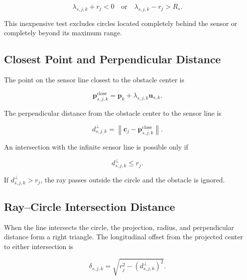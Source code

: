 \documentclass[10pt,twocolumn,a4paper]{article}
\begin{document}
\begin{equation}
    \lambda_{s,j,k}+r_j<0
    \quad\text{or}\quad
    \lambda_{s,j,k}-r_j>R_s.
    \label{eq:range_rejection}
\end{equation}

This inexpensive test excludes circles located completely behind the
sensor or completely beyond its maximum range.

\subsection{Closest Point and Perpendicular Distance}

The point on the sensor line closest to the obstacle center is

\begin{equation}
    \mathbf{p}^{\mathrm{close}}_{s,j,k}
    =
    \mathbf{p}_k
    +\lambda_{s,j,k}\mathbf{u}_{s,k}.
    \label{eq:closest_point}
\end{equation}

The perpendicular distance from the obstacle center to the sensor line
is

\begin{equation}
    d^{\perp}_{s,j,k}
    =
    \left\|
    \mathbf{c}_j-\mathbf{p}^{\mathrm{close}}_{s,j,k}
    \right\|.
    \label{eq:distance_to_ray}
\end{equation}

An intersection with the infinite sensor line is possible only if

\begin{equation}
    d^{\perp}_{s,j,k}\leq r_j.
    \label{eq:line_circle_condition}
\end{equation}

If $d^{\perp}_{s,j,k}>r_j$, the ray passes outside the circle and the
obstacle is ignored.

\subsection{Ray--Circle Intersection Distance}

When the line intersects the circle, the projection, radius, and
perpendicular distance form a right triangle. The longitudinal offset
from the projected center to either intersection is

\begin{equation}
    \delta_{s,j,k}
    =
    \sqrt{r_j^2-\left(d^{\perp}_{s,j,k}\right)^2}.
    \label{eq:intersection_offset}
\end{equation}
\end{document}
